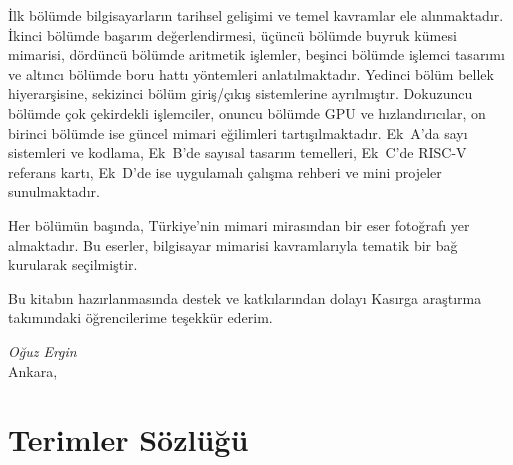 \documentclass[12pt, a4paper, twoside, openright]{book}
\begin{document}
İlk bölümde bilgisayarların tarihsel gelişimi ve temel kavramlar ele alınmaktadır. İkinci bölümde başarım değerlendirmesi, üçüncü bölümde buyruk kümesi mimarisi, dördüncü bölümde aritmetik işlemler, beşinci bölümde işlemci tasarımı ve altıncı bölümde boru hattı yöntemleri anlatılmaktadır. Yedinci bölüm bellek hiyerarşisine, sekizinci bölüm giriş/çıkış sistemlerine ayrılmıştır. Dokuzuncu bölümde çok çekirdekli işlemciler, onuncu bölümde GPU ve hızlandırıcılar, on birinci bölümde ise güncel mimari eğilimleri tartışılmaktadır. Ek~A'da sayı sistemleri ve kodlama, Ek~B'de sayısal tasarım temelleri, Ek~C'de RISC-V referans kartı, Ek~D'de ise uygulamalı çalışma rehberi ve mini projeler sunulmaktadır.

Her bölümün başında, Türkiye'nin mimari mirasından bir eser fotoğrafı yer almaktadır. Bu eserler, bilgisayar mimarisi kavramlarıyla tematik bir bağ kurularak seçilmiştir.

Bu kitabın hazırlanmasında destek ve katkılarından dolayı Kasırga araştırma takımındaki öğrencilerime teşekkür ederim.

\vspace{1cm}
\begin{flushright}
\textit{Oğuz Ergin}\\
Ankara, \the\year
\end{flushright}
\cleardoublepage

\tableofcontents
\cleardoublepage
\listoffigures
\cleardoublepage
\listoftables
\cleardoublepage
\listofbilginotlari

\mainmatter













\appendix





\backmatter

\chapter*{Terimler Sözlüğü}


\printbibliography[keyword=atif, title={Kaynakça}]

\nocite{*}
\printbibliography[notkeyword=atif, title={Önerilen Kaynaklar}]

\printindex


\end{document}
